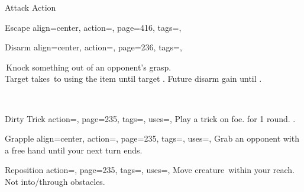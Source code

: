 \begin{PageBackLandscape}
\begin{TablesHalf}{\backTableHeight}
\begin{Table}{Attack Action}
\begin{entry}{Escape}{%
                align=center,
                action=,
                page=416,
                tags=\Attack,
            }
            \end{entry}
            \begin{entry}{Disarm}{%
                align=center,
                action=,
                page=236,
                tags=\Attack,
            }
                \begin{minipage}{0.8\linewidth}
                    \AthleticsReflex[tags={T}] \dash\,Knock something out of an opponent's grasp.\\
                    Target takes \,\Cirm to using the item until target . Future disarm gain  \Cirm until .
                \end{minipage}\hfill
                \begin{minipage}{0.2\linewidth}
                    \raggedleft
                    \\
                \end{minipage}
            \end{entry}
            \begin{entry}{Dirty Trick}{%
                action=,
                page=235,
                tags=\Attack\Manipulate,
                uses=\ThieveryReflex\Feat,
            }
                Play a trick on foe. \Clumsy for 1 round.  .
            \end{entry}
            \begin{entry}{Grapple}{%
                align=center,
                action=,
                page=235,
                tags=\Attack,
                uses=\AthleticsFortitude,
            }
                Grab an opponent with a free hand until your next turn ends. \hfill{}\\
                \hspace{10.5ex}\hfill
            \end{entry}
            \begin{entry}{Reposition}{%
                action=,
                page=235,
                tags=\Attack,
                uses=\AthleticsFortitude,
            }
                Move creature \,\Feet within your reach. Not into/through obstacles.\hfill

\end{entry}
\end{Table}
\end{TablesHalf}
\end{PageBackLandscape}
